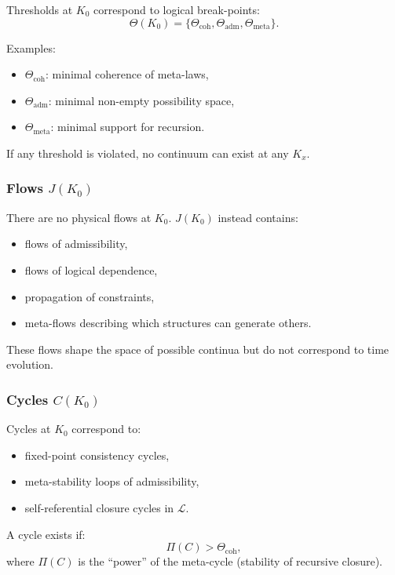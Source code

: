 Thresholds at $K_0$ correspond to logical break-points:
\[
\Theta(K_0) = \{ \Theta_{\mathrm{coh}}, \Theta_{\mathrm{adm}},
                 \Theta_{\mathrm{meta}} \}.
\]

Examples:
\begin{itemize}
    \item $\Theta_{\mathrm{coh}}$: minimal coherence of meta-laws,
    \item $\Theta_{\mathrm{adm}}$: minimal non-empty possibility space,
    \item $\Theta_{\mathrm{meta}}$: minimal support for recursion.
\end{itemize}

If any threshold is violated, no continuum can exist at any $K_x$.

\subsubsection{Flows \texorpdfstring{$J(K_0)$}{J(K_0)}}

There are no physical flows at $K_0$.
$J(K_0)$ instead contains:
\begin{itemize}
    \item flows of admissibility,
    \item flows of logical dependence,
    \item propagation of constraints,
    \item meta-flows describing which structures can generate others.
\end{itemize}

These flows shape the space of possible continua but do not correspond
to time evolution.

\subsubsection{Cycles \texorpdfstring{$C(K_0)$}{C(K_0)}}

Cycles at $K_0$ correspond to:
\begin{itemize}
    \item fixed-point consistency cycles,
    \item meta-stability loops of admissibility,
    \item self-referential closure cycles in $\mathcal{L}$.
\end{itemize}

A cycle exists if:
\[
\Pi(C) > \Theta_{\mathrm{coh}},
\]
where $\Pi(C)$ is the ``power'' of the meta-cycle (stability of recursive
closure).

